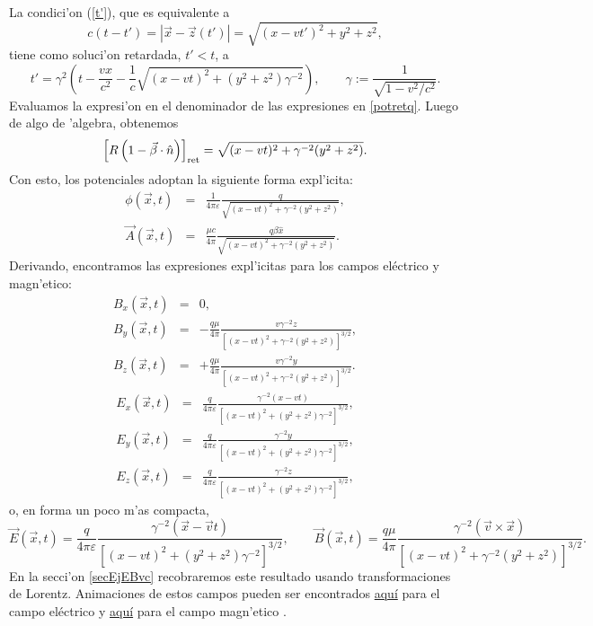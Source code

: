 La condici'on (\ref{t'}), que es equivalente a
\begin{equation}
c(t-t')=\left|\vec{x}-\vec{z}(t')\right|=\sqrt{(x-vt')^2+y^2+z^2},
\end{equation}
tiene como soluci'on retardada, $t'<t$, a
\begin{equation}
t'=\gamma^2\left( t-\frac{vx}{c^2}-\frac{1}{c}\sqrt{(x-vt)^2+
(y^2+z^2)\gamma^{-2}}\right) , \qquad \gamma:=\frac{1}{\sqrt{1-v^2/c^2}}.
\end{equation}
Evaluamos la expresi'on en el denominador de las expresiones en \eqref{potretq}. Luego de algo de 'algebra, obtenemos
\begin{equation}
\left[ R\left(1-\vec{\beta}\cdot\hat{n}\right)\right]_{\rm ret}=\sqrt{(x-vt)^2+  \gamma^{-2}(y^2+z^2)}.
\end{equation}
Con esto, los potenciales adoptan la siguiente forma expl'icita:
\begin{eqnarray}
\phi(\vec{x},t)&=&\frac{1}{4\pi\varepsilon}\frac{q}{\sqrt{(x-vt)^2+ \gamma^{-2}(y^2+z^2)}} ,\\
\vec{A}(\vec{x},t)&=&\frac{\mu c}{4\pi} \frac{q\beta\hat{x}}{\sqrt{(x-vt)^2+
\gamma^{-2}(y^2+z^2)}}.
\end{eqnarray}
Derivando, encontramos las expresiones expl'icitas para los campos eléctrico y magn'etico:
\begin{eqnarray}
B_x(\vec{x},t)&=&0, \\
B_y(\vec{x},t)&=&-\frac{q\mu}{4\pi}\frac{v\gamma^{-2}z}{\left[ (x-vt)^2+
\gamma^{-2}(y^2+z^2)\right]^{3/2}}, \\
B_z(\vec{x},t)&=&+\frac{q\mu}{4\pi}\frac{v\gamma^{-2}y}{\left[(x-vt)^2+
\gamma^{-2}(y^2+z^2)\right]^{3/2}}.
\end{eqnarray}
\begin{eqnarray}
E_x(\vec{x},t)&=&\frac{q}{4\pi\varepsilon}\frac{\gamma^{-2}\left( x-vt\right) }{\left[ (x-vt)^2+
(y^2+z^2)\gamma^{-2}\right] ^{3/2}}, \\
E_y(\vec{x},t)&=&\frac{q}{4\pi\varepsilon}\frac{\gamma^{-2}y}{\left[ (x-vt)^2+
(y^2+z^2)\gamma^{-2}\right] ^{3/2}},\\
E_z(\vec{x},t)&=&\frac{q}{4\pi\varepsilon}\frac{\gamma^{-2}z }{\left[ (x-vt)^2+
(y^2+z^2)\gamma^{-2}\right]
^{3/2}},
\end{eqnarray}
o, en forma un poco m'as compacta,
\begin{equation}\label{EBqvconst}
\vec{E}(\vec{x},t)=\frac{q}{4\pi\varepsilon}\frac{\gamma^{-2}\left(\vec{x}-\vec{v}t\right)}{\left[(x-vt)^2+ (y^2+z^2)\gamma^{-2}\right] ^{3/2}},  \qquad
\vec{B}(\vec{x},t)=\frac{q\mu}{4\pi}\frac{\gamma^{-2}(\vec{v}\times\vec{x})}{\left[(x-vt)^2+\gamma^{-2}(y^2+z^2)\right]^{3/2}}.
\end{equation}
En la secci'on \ref{secEjEBvc} recobraremos este resultado usando transformaciones de Lorentz. Animaciones de estos campos pueden ser encontrados \href{http://web.mit.edu/viz/EM/visualizations/electrostatics/ElectricFieldConfigurations/MovingChargePosElec/movingChargePosElec.htm}{aqu\'i} para el campo eléctrico y \href{http://web.mit.edu/viz/EM/visualizations/magnetostatics/MagneticFieldConfigurations/MovingChargePosMag/MovingChargePosMag.htm}{aqu\'i} para el campo magn'etico \cite{MIT}.


